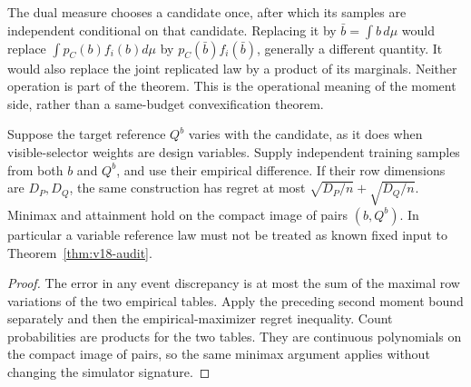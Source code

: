 The dual measure chooses a candidate once, after which its samples are
independent conditional on that candidate. Replacing it by
$\bar b=\int b\,d\mu$ would replace $\int p_C(b)f_i(b)d\mu$ by
$p_C(\bar b)f_i(\bar b)$, generally a different quantity. It would also
replace the joint replicated law by a product of its marginals. Neither
operation is part of the theorem. This is the operational meaning of the
moment side, rather than a same-budget convexification theorem.

\begin{proposition}
\label{prop:v18-paired}
Suppose the target reference $Q^b$ varies with the candidate, as it does
when visible-selector weights are design variables. Supply independent
training samples from both $b$ and $Q^b$, and use their empirical
difference. If their row dimensions are $D_P,D_Q$, the same construction
has regret at most
$\sqrt{D_P/n}+\sqrt{D_Q/n}$. Minimax and attainment hold on the compact
image of pairs $(b,Q^b)$. In particular a variable reference law must not
be treated as known fixed input to Theorem~\ref{thm:v18-audit}.
\end{proposition}
\begin{proof}
The error in any event discrepancy is at most the sum of the maximal
row variations of the two empirical tables. Apply the preceding second
moment bound separately and then the empirical-maximizer regret inequality.
Count probabilities are products for the two tables. They are continuous
polynomials on the compact image of pairs, so the same minimax argument
applies without changing the simulator signature.
\end{proof}

